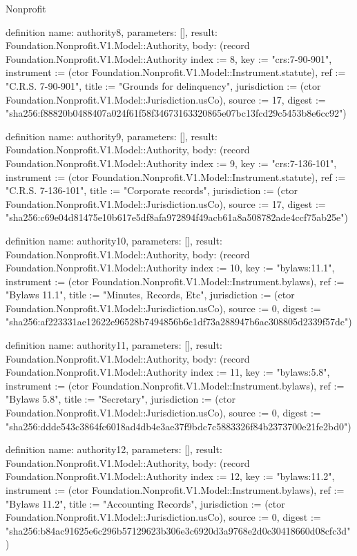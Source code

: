 \begin{lexlean}{Nonprofit}
\begin{semanticmodule}
definition{
  name: authority8,
  parameters: [],
  result: Foundation.Nonprofit.V1.Model::Authority,
  body: (record Foundation.Nonprofit.V1.Model::Authority {index := 8, key := "crs:7-90-901", instrument := (ctor Foundation.Nonprofit.V1.Model::Instrument.statute), ref := "C.R.S. 7-90-901", title := "Grounds for delinquency", jurisdiction := (ctor Foundation.Nonprofit.V1.Model::Jurisdiction.usCo), source := 17, digest := "sha256:f88820b0488407a024f61f58f34673163320865e07bc13fcd29c5453b8e6cc92"})
}

definition{
  name: authority9,
  parameters: [],
  result: Foundation.Nonprofit.V1.Model::Authority,
  body: (record Foundation.Nonprofit.V1.Model::Authority {index := 9, key := "crs:7-136-101", instrument := (ctor Foundation.Nonprofit.V1.Model::Instrument.statute), ref := "C.R.S. 7-136-101", title := "Corporate records", jurisdiction := (ctor Foundation.Nonprofit.V1.Model::Jurisdiction.usCo), source := 17, digest := "sha256:c69e04d81475e10b617e5df8afa972894f49acb61a8a508782ade4ccf75ab25e"})
}

definition{
  name: authority10,
  parameters: [],
  result: Foundation.Nonprofit.V1.Model::Authority,
  body: (record Foundation.Nonprofit.V1.Model::Authority {index := 10, key := "bylaws:11.1", instrument := (ctor Foundation.Nonprofit.V1.Model::Instrument.bylaws), ref := "Bylaws 11.1", title := "Minutes, Records, Etc", jurisdiction := (ctor Foundation.Nonprofit.V1.Model::Jurisdiction.usCo), source := 0, digest := "sha256:af223331ae12622e96528b7494856b6c1df73a288947b6ac308805d2339f57dc"})
}

definition{
  name: authority11,
  parameters: [],
  result: Foundation.Nonprofit.V1.Model::Authority,
  body: (record Foundation.Nonprofit.V1.Model::Authority {index := 11, key := "bylaws:5.8", instrument := (ctor Foundation.Nonprofit.V1.Model::Instrument.bylaws), ref := "Bylaws 5.8", title := "Secretary", jurisdiction := (ctor Foundation.Nonprofit.V1.Model::Jurisdiction.usCo), source := 0, digest := "sha256:ddde543c3864fc6018ad4db4e3ae37f9bdc7c5883326f84b2373700e21fe2bd0"})
}

definition{
  name: authority12,
  parameters: [],
  result: Foundation.Nonprofit.V1.Model::Authority,
  body: (record Foundation.Nonprofit.V1.Model::Authority {index := 12, key := "bylaws:11.2", instrument := (ctor Foundation.Nonprofit.V1.Model::Instrument.bylaws), ref := "Bylaws 11.2", title := "Accounting Records", jurisdiction := (ctor Foundation.Nonprofit.V1.Model::Jurisdiction.usCo), source := 0, digest := "sha256:b84ac91625e6c296b57129623b306e3c6920d3a9768e2d0c30418660d08cfc3d"})
}


\end{semanticmodule}
\end{lexlean}
